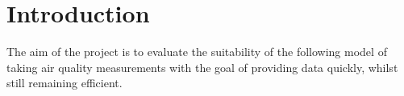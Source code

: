 \section{Introduction}\label{intro}

The aim of the project is to evaluate the suitability of the following model of taking air quality measurements with the goal of providing data quickly, whilst still remaining efficient. 


